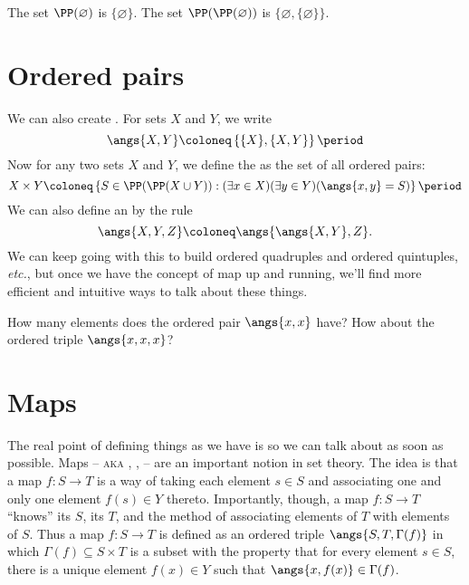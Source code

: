 \begin{exm}
	The set $\PP(\varnothing)$ is $\{\varnothing\}$.
	The set $\PP(\PP(\varnothing))$ is $\{\varnothing, \{\varnothing\}\}$.
\end{exm}

\section{Ordered pairs}%
\label{sec:ordered_pairs}

We can also create .
For sets $X$ and $Y$, we write
\[
	\angs{X,Y}\coloneq\left\{\{X\},\{X,Y\}\right\} \period
\]
Now for any two sets $X$ and $Y$, we define the  as the set of all ordered pairs:
\[
	X\times Y\coloneq\left\{S\in\PP(\PP(X\cup Y)) : (\exists x\in X)(\exists y\in Y)(\angs{x,y}=S)\right\} \period
\]
We can also define an  by the rule
\[
	\angs{X,Y,Z}\coloneq\angs{\angs{X,Y},Z}.
\]
We can keep going with this to build ordered quadruples and ordered quintuples, \emph{etc.},
but once we have the concept of map up and running, we'll find more efficient and intuitive ways to talk about these things.

\begin{exr}
	How many elements does the ordered pair $\angs{x,x}$ have? How about the ordered triple $\angs{x,x,x}$?
\end{exr}

\section{Maps}%
\label{sec:maps}

The real point of defining things as we have is so we can talk about  as soon as possible.
Maps -- \textsc{aka} , ,  -- are an important notion in set theory.
The idea is that a map $f\colon S \to T$ is a way of taking each element $s\in S$ and associating one and only one element $f(s)\in Y$ thereto.
Importantly, though, a map $f\colon S \to T$ \enquote{knows} its  $S$, its  $T$, and the method of associating elements of $T$ with elements of $S$.
Thus a map $f\colon S \to T$ is defined as an ordered triple $\angs{S,T,\Gamma(f)}$ in which $\Gamma(f) \subseteq S \times T$ is a subset with the property that for every element $s \in S$, there is a unique%
element $f(x)\in Y$ such that $\angs{x,f(x)}\in\Gamma(f)$.

